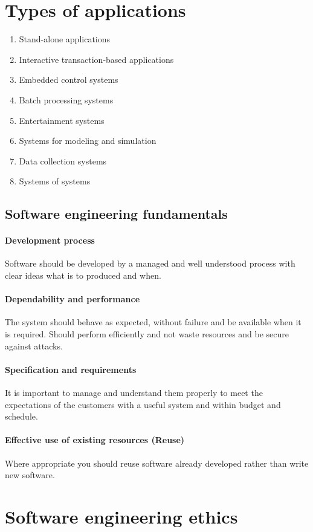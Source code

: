\documentclass[a4paper,11pt,twocolumn]{report}
\begin{document}
    \section{Types of applications}
    \begin{enumerate}
        \item Stand-alone applications
        \item Interactive transaction-based applications
        \item Embedded control systems
        \item Batch processing systems
        \item Entertainment systems
        \item Systems for modeling and simulation
        \item Data collection systems
        \item Systems of systems
    \end{enumerate}
    \subsection{Software engineering fundamentals}
    \paragraph{Development process}
    Software should be developed by a managed and well understood process with
    clear ideas what is to produced and when.
    \paragraph{Dependability and performance}
    The system should behave as expected, without failure and be available when
    it is required. Should perform efficiently and not waste resources and be
    secure against attacks.
    \paragraph{Specification and requirements}
    It is important to manage and understand them properly to meet the
    expectations of the customers with a useful system and within budget and
    schedule.
    \paragraph{Effective use of existing resources (Reuse)}
    Where appropriate you should reuse software already developed rather than
    write new software.
    \section{Software engineering ethics}
\end{document}
